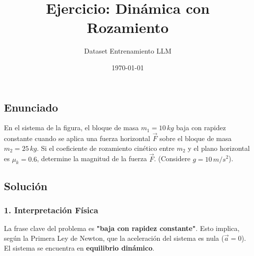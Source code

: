 \documentclass[12pt, a4paper]{article}
\title{Ejercicio: Dinámica con Rozamiento}
\author{Dataset Entrenamiento LLM}
\date{\today}
\begin{document}
\maketitle

\subsection*{Enunciado}
En el sistema de la figura, el bloque de masa $m_1 = 10 \, \si{kg}$ baja con rapidez constante cuando se aplica una fuerza horizontal $\vec{F}$ sobre el bloque de masa $m_2 = 25 \, \si{kg}$. Si el coeficiente de rozamiento cinético entre $m_2$ y el plano horizontal es $\mu_k = 0.6$, determine la magnitud de la fuerza $\vec{F}$. (Considere $g=10\,\si{m/s^2}$).

\begin{center}
\end{center}

\subsection*{Solución}

\subsubsection*{1. Interpretación Física}
La frase clave del problema es \textbf{"baja con rapidez constante"}. Esto implica, según la Primera Ley de Newton, que la aceleración del sistema es nula ($\vec{a} = 0$). El sistema se encuentra en \textbf{equilibrio dinámico}.
\end{document}
